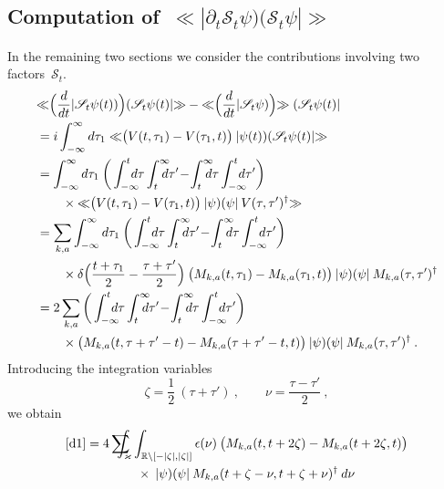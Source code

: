 \documentclass[reqno,11pt]{amsart}
\numberwithin{equation}{section}
\newcommand{\bbra}{\mathopen{\ll}}
\newcommand{\kket}{\mathclose{\gg}}
\newcommand{\R}{\mathbb{R}}
\newcommand{\1}{\mathds{1}}
\newcommand{\Sig}{\mathscr{S}}
\newcommand{\sint}{\sum  \!\!\!\!\!\!\! \int }
\begin{document}
{\subsection{Computation of~$\bbra |\partial_t \Sig_t \psi)(\Sig_t \psi| \kket$} \label{secSS1}
In the remaining two sections we consider the contributions involving two factors~$\Sig_t$.
\begin{align}
&\bbra \Big( \frac{d}{dt} | \Sig_t \psi(t)) \Big)  ( \Sig_t \psi(t) | \kket - \bbra \Big( \frac{d}{dt} |\Sig_t \psi) \Big) \kket \; ( \Sig_t \psi(t)| \notag \\
&= i \int_{-\infty}^\infty d\tau_1 \;\bbra \big( V(t,\tau_1) - V(\tau_1,t) \big) \:|\psi(t))( \Sig_t \psi(t)| \kket \notag \\
&= \int_{-\infty}^\infty d\tau_1 \:\bigg( \int_{-\infty}^t \!\!\!\!\!d\tau \int_t^\infty \!\!\!\!\!d\tau' \!-\! \int_t^\infty \!\!\!\!\!d\tau \int_{-\infty}^t \!\!\!\!\!d\tau' \bigg) \notag \\
&\qquad \times \bbra \big( V(t,\tau_1) - V(\tau_1,t) \big) \:|\psi)(\psi|\: V(\tau,\tau')^\dagger \kket \notag \\
&= \sum_{k,a} \int_{-\infty}^\infty d\tau_1 \:\bigg( \int_{-\infty}^t \!\!\!\!\!d\tau \int_t^\infty \!\!\!\!\!d\tau' \!-\! \int_t^\infty \!\!\!\!\!d\tau \int_{-\infty}^t \!\!\!\!\!d\tau' \bigg) \notag \\
&\qquad \times \delta \Big( \frac{t+\tau_1}{2} - \frac{\tau+\tau'}{2} \Big) \: 
\big( M_{k,a}(t,\tau_1) - M_{k,a}(\tau_1,t) \big) \:|\psi)(\psi|\: M_{k,a}(\tau,\tau')^\dagger \notag \\
&= 2 \sum_{k,a} \bigg( \int_{-\infty}^t \!\!\!\!\!d\tau \int_t^\infty \!\!\!\!\!d\tau' \!-\! \int_t^\infty \!\!\!\!\!d\tau \int_{-\infty}^t \!\!\!\!\!d\tau' \bigg) \notag \\
&\qquad \times  \big( M_{k,a}(t,\tau+\tau'-t) - M_{k,a}(\tau+\tau'-t,t) \big)
\:|\psi)(\psi|\: M_{k,a}(\tau,\tau')^\dagger \:. \label{d1}
\end{align}
Introducing the integration variables
\[ \zeta = \frac{1}{2}\:(\tau+\tau') \:,\qquad \nu = \frac{\tau-\tau'}{2} \:, \]
we obtain
\begin{align*}
\eqref{d1} &= 4 \sint_\varkappa \int_{\R \setminus [-|\zeta|, |\zeta|]} \epsilon(\nu)\:
\big( M_{k,a} (t, t+2 \zeta)- M_{k,a} (t+2 \zeta, t)  \big)  \\
&\qquad\qquad \times\:|\psi)(\psi|\: M_{k,a} (t+\zeta-\nu, t+ \zeta+\nu)^\dagger\: d\nu
\end{align*}

}
\end{document}
